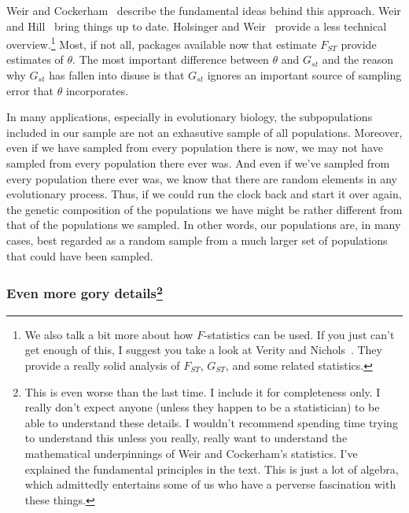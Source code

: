 Weir and Cockerham~\cite{WeirCockerham84} describe the fundamental
ideas behind this approach. Weir and Hill~\cite{Weir-Hill-2002} bring
things up to date. Holsinger and Weir~\cite{Holsinger-Weir-2009}
provide a less technical overview.\footnote{We also talk a bit more
  about how $F$-statistics can be used. If you just can't get enough
  of this, I suggest you take a look at Verity and
  Nichols~\cite{Verity-Nichols-2014}. They provide a really solid
  analysis of $F_{ST}$, $G_{ST}$, and some related statistics.} Most,
if not all, packages available now that estimate $F_{ST}$ provide
estimates of $\theta$. The most important difference between $\theta$
and $G_{st}$ and the reason why $G_{st}$ has fallen into disuse is
that $G_{st}$ ignores an important source of sampling error that
$\theta$ incorporates.

In many applications, especially in evolutionary biology, the
subpopulations included in our sample are not an exhasutive sample of
all populations. Moreover, even if we have sampled from every
population there is now, we may not have sampled from every population
there ever was. And even if we've sampled from every population there
ever was, we know that there are random elements in any evolutionary
process. Thus, if we could run the clock back and start it over again,
the genetic composition of the populations we have might be rather
different from that of the populations we sampled. In other words, our
populations are, in many cases, best regarded as a random sample from
a much larger set of populations that could have been
sampled.

\subsubsection*{Even more gory details\footnote{This is even worse
    than the last time. I include it for completeness only. I really
    don't expect anyone (unless they happen to be a statistician) to
    be able to understand these details. I wouldn't recommend spending
    time trying to understand this unless you really, really want to
    understand the mathematical underpinnings of Weir and Cockerham's
    statistics. I've explained the fundamental principles in the
    text. This is just a lot of algebra, which admittedly entertains
    some of us who have a perverse fascination with these things.}}

